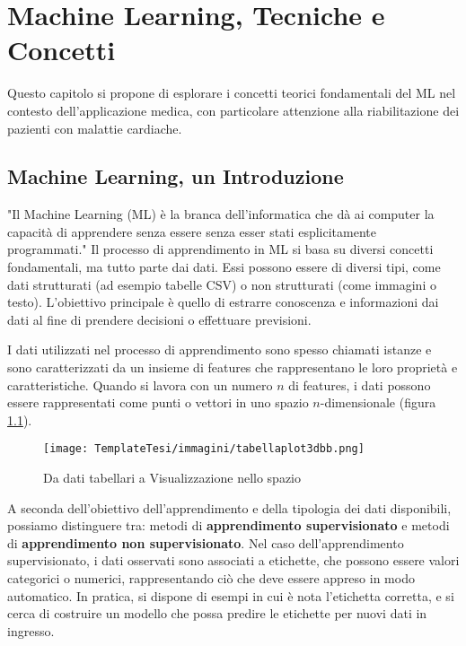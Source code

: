 \chapter{Machine Learning, Tecniche e Concetti}
\label{ch:capitolo2}
Questo capitolo si propone di esplorare i concetti teorici fondamentali del ML nel contesto dell'applicazione medica, con particolare attenzione alla riabilitazione dei pazienti con malattie cardiache.

\section{Machine Learning, un Introduzione}
\begin{flushleft}
    

"Il Machine Learning (ML) è la branca dell'informatica che dà ai computer la capacità di apprendere senza essere  senza esser stati esplicitamente programmati."\cite{HandsOnML}
Il processo di apprendimento in ML si basa su diversi concetti fondamentali, ma tutto parte dai dati.
Essi possono essere di diversi tipi, come dati strutturati (ad esempio tabelle CSV) o non strutturati (come immagini o testo). L'obiettivo principale è quello di estrarre conoscenza e informazioni dai dati al fine di prendere decisioni o effettuare previsioni.

I dati utilizzati nel processo di apprendimento sono spesso chiamati istanze e sono caratterizzati da un insieme di features che rappresentano le loro proprietà e caratteristiche. Quando si lavora con un numero 
$n$ di features, i dati possono essere rappresentati come punti o vettori in uno spazio
$n$-dimensionale (figura \ref{fig:puntispazion}).

\begin{figure}[H]
    \centering
    \texttt{[image: TemplateTesi/immagini/tabellaplot3dbb.png]}
    \caption{Da dati tabellari a Visualizzazione nello spazio}
    \label{fig:puntispazion}
\end{figure}



A seconda dell'obiettivo dell'apprendimento e della tipologia dei dati disponibili, possiamo distinguere tra:
metodi di \textbf{apprendimento supervisionato} e metodi di \textbf{apprendimento non supervisionato}. 
Nel caso dell'apprendimento supervisionato, i dati osservati sono associati a etichette, che possono essere valori categorici o numerici, rappresentando ciò che deve essere appreso in modo automatico. In pratica, si dispone di esempi in cui è nota l'etichetta corretta, e si cerca di costruire un modello che possa predire le etichette per nuovi dati in ingresso. 


\end{flushleft}
